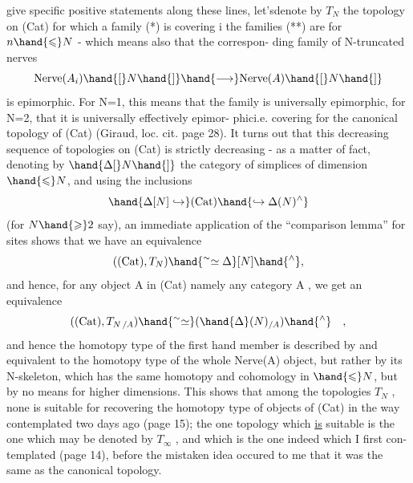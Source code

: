 give specific positive statements along these lines, let'sdenote
by $T_N$ the topology on (Cat) for which a family (*) is covering i
the families (**) are for $n\hand{\leqslant} N$ - which means also that the correspon-%
ding family of N-truncated nerves
\[ \mathrm{Nerve}(A_i)\hand{[}N\hand{]} \hand{\longrightarrow} \mathrm{Nerve}(A)\hand{[}N\hand{]} \]
is epimorphic. For N=1, this means that the family is universally
epimorphic, for N=2, that it is universally effectively epimor-%
phici.e. covering for the canonical topology of (Cat) (Giraud, loc.
cit. page 28). It turns out that this decreasing sequence of topologies
on (Cat) is strictly decreasing - as a matter of fact, denoting by
$\hand{\Delta[}N\hand{]}$ the category of simplices of dimension $\hand{\leqslant} N$, and using the
inclusions
\[ \hand{\Delta[N]\hookrightarrow}(\mathrm{Cat})\hand{\hookrightarrow\Delta(N)^{\wedge}} \]
(for $N\hand{\geqslant}2$ say), an immediate application of the ``comparison lemma'' for
sites shows that we have an equivalence
\[ ((\mathrm{Cat}),T_N)\hand{^{\sim}\simeq\Delta}[N]\hand{^{\wedge}}, \]
and hence, for any object A in (Cat) namely any category A , we get
an equivalence
\[ ((\mathrm{Cat}),T_{N\,/A})\hand{^{\sim}\simeq}(\hand{\Delta}(N)_{/A})\hand{^{\wedge}} \quad , \]
and hence the homotopy type of the first hand member is described by and
equivalent to the homotopy type of the whole Nerve(A) object, but
rather by its N-skeleton, which has the same homotopy and cohomology
 in  $\hand{\leqslant} N$, but by no means for higher dimensions. This
shows that among the topologies $T_N$ , none is suitable for recovering
the homotopy type of objects of (Cat) in the way contemplated two days
ago (page 15);  the one topology which \uline{is} suitable is the one which
may be denoted by $T_{\infty}$ , and which is the one indeed which I first con-%
templated (page 14), before the mistaken idea occured to me that it was
the same as the canonical topology.

